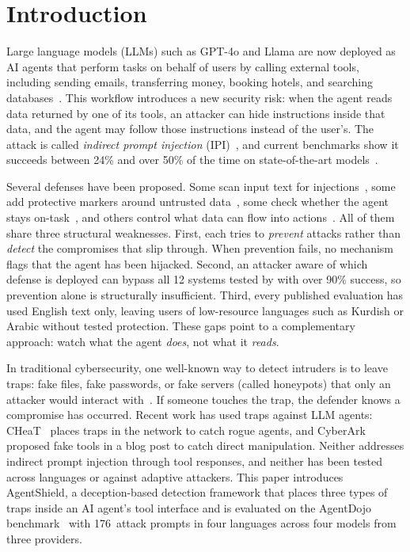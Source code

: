 \documentclass[preprint,12pt]{elsarticle}
\begin{document}
\section{Introduction}
\label{sec:intro}

Large language models (LLMs) such as GPT-4o and Llama are now deployed as AI agents that perform tasks on behalf of users by calling external tools, including sending emails, transferring money, booking hotels, and searching databases~\citep{yao2023react}. This workflow introduces a new security risk: when the agent reads data returned by one of its tools, an attacker can hide instructions inside that data, and the agent may follow those instructions instead of the user's. The attack is called \emph{indirect prompt injection} (IPI)~\citep{greshake2023not}, and current benchmarks show it succeeds between 24\% and over 50\% of the time on state-of-the-art models~\citep{zhan2024injecagent,aisafety2025international}.

Several defenses have been proposed. Some scan input text for injections~\citep{liu2025datasentinel}, some add protective markers around untrusted data~\citep{hines2024spotlighting}, some check whether the agent stays on-task~\citep{kim2024taskshield}, and others control what data can flow into actions~\citep{costa2025fides}. All of them share three structural weaknesses. First, each tries to \emph{prevent} attacks rather than \emph{detect} the compromises that slip through. When prevention fails, no mechanism flags that the agent has been hijacked. Second, an attacker aware of which defense is deployed can bypass all 12 systems tested by \citet{nasr2025attacker} with over 90\% success, so prevention alone is structurally insufficient. Third, every published evaluation has used English text only, leaving users of low-resource languages such as Kurdish or Arabic without tested protection. These gaps point to a complementary approach: watch what the agent \emph{does}, not what it \emph{reads}.

In traditional cybersecurity, one well-known way to detect intruders is to leave traps: fake files, fake passwords, or fake servers (called honeypots) that only an attacker would interact with~\citep{spitzner2003honeypots}. If someone touches the trap, the defender knows a compromise has occurred. Recent work has used traps against LLM agents: CHeaT~\citep{ayzenshteyn2025cloak} places traps in the network to catch rogue agents, and CyberArk~\citep{rabin2025cyberark} proposed fake tools in a blog post to catch direct manipulation. Neither addresses indirect prompt injection through tool responses, and neither has been tested across languages or against adaptive attackers. This paper introduces AgentShield, a deception-based detection framework that places three types of traps inside an AI agent's tool interface and is evaluated on the AgentDojo benchmark~\citep{debenedetti2024agentdojo} with 176~attack prompts in four languages across four models from three providers.
\end{document}
